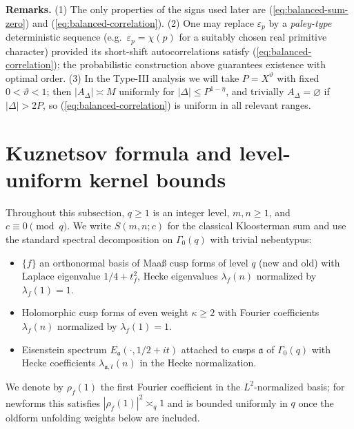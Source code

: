 \documentclass[11pt]{article}
\def\eqref#1{(\ref{#1})}%
\theoremstyle{definition}
\theoremstyle{remark}
\numberwithin{equation}{part}
\begin{document}
\noindent\textbf{Remarks.}
(1) The only properties of the signs used later are \eqref{eq:balanced-sum-zero} and \eqref{eq:balanced-correlation}.
(2) One may replace $\varepsilon_p$ by a \emph{paley-type} deterministic sequence (e.g.\ $\varepsilon_p=\chi(p)$ for a suitably chosen real primitive character) provided its short-shift autocorrelations satisfy \eqref{eq:balanced-correlation}; the probabilistic construction above guarantees existence with optimal order.
(3) In the Type-III analysis we will take $P=X^\vartheta$ with fixed $0<\vartheta<1$; then $|A_\Delta|\asymp M$ uniformly for $|\Delta|\le P^{1-\eta}$, and trivially $A_\Delta=\varnothing$ if $|\Delta|>2P$, so \eqref{eq:balanced-correlation} is uniform in all relevant ranges.


\bigskip

\section{Kuznetsov formula and level-uniform kernel bounds}\label{sec:kuznetsov-uniform}

Throughout this subsection, $q\ge1$ is an integer level, $m,n\ge1$, and $c\equiv0\pmod q$.
We write $S(m,n;c)$ for the classical Kloosterman sum and use the standard spectral decomposition on $\Gamma_0(q)$ with trivial nebentypus:
\begin{itemize}[leftmargin=2em]
	\item $\{f\}$ an orthonormal basis of Maaß cusp forms of level $q$ (new and old) with Laplace eigenvalue $1/4+t_f^2$, Hecke eigenvalues $\lambda_f(n)$ normalized by $\lambda_f(1)=1$.
	\item Holomorphic cusp forms of even weight $\kappa\ge2$ with Fourier coefficients $\lambda_f(n)$ normalized by $\lambda_f(1)=1$.
	\item Eisenstein spectrum $E_\mathfrak a(\cdot,1/2+it)$ attached to cusps $\mathfrak a$ of $\Gamma_0(q)$ with Hecke coefficients $\lambda_{\mathfrak a, t}(n)$ in the Hecke normalization.
\end{itemize}
We denote by $\rho_f(1)$ the first Fourier coefficient in the $L^2$-normalized basis; for newforms this satisfies $|\rho_f(1)|^2\asymp_q 1$ and is bounded uniformly in $q$ once the oldform unfolding weights below are included.
\end{document}
